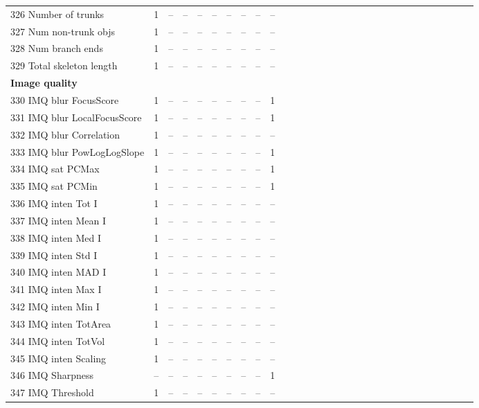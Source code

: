 \documentclass[sn-mathphys,Numbered]{sn-jnl}%
\theoremstyle{thmstyleone}%
\theoremstyle{thmstyletwo}%
\theoremstyle{thmstylethree}%
\begin{document}
\begin{table}[!hbt]
\begin{tiny}
\begin{tabular} {
l  c  c  c  c  c  c  c  c  c  l  c  c  c  c  c  c  c  c  c  l  c  c  c  c  c  c  c  c  c
}
 326 Number of trunks & 1 & -- & -- & -- & -- & -- & -- & -- & -- \\
 327 Num non-trunk objs & 1 & -- & -- & -- & -- & -- & -- & -- & -- \\
 328 Num branch ends & 1 & -- & -- & -- & -- & -- & -- & -- & -- \\
 329 Total skeleton length & 1 & -- & -- & -- & -- & -- & -- & -- & -- \\
\hspace{2mm}  \bf Image quality \rm &  &  &  &  &  &  &  &  &  \\
 330 IMQ blur FocusScore & 1 & -- & -- & -- & -- & -- & -- & -- & 1 \\
 331 IMQ blur LocalFocusScore & 1 & -- & -- & -- & -- & -- & -- & -- & 1 \\
 332 IMQ blur Correlation & 1 & -- & -- & -- & -- & -- & -- & -- & -- \\
 333 IMQ blur PowLogLogSlope & 1 & -- & -- & -- & -- & -- & -- & -- & 1 \\
 334 IMQ sat PCMax & 1 & -- & -- & -- & -- & -- & -- & -- & 1 \\
 335 IMQ sat PCMin & 1 & -- & -- & -- & -- & -- & -- & -- & 1 \\
 336 IMQ inten Tot I & 1 & -- & -- & -- & -- & -- & -- & -- & -- \\
 337 IMQ inten Mean I & 1 & -- & -- & -- & -- & -- & -- & -- & -- \\
 338 IMQ inten Med I & 1 & -- & -- & -- & -- & -- & -- & -- & -- \\
 339 IMQ inten Std I & 1 & -- & -- & -- & -- & -- & -- & -- & -- \\
 340 IMQ inten MAD I & 1 & -- & -- & -- & -- & -- & -- & -- & -- \\
 341 IMQ inten Max I & 1 & -- & -- & -- & -- & -- & -- & -- & -- \\
 342 IMQ inten Min I & 1 & -- & -- & -- & -- & -- & -- & -- & -- \\
 343 IMQ inten TotArea & 1 & -- & -- & -- & -- & -- & -- & -- & -- \\
 344 IMQ inten TotVol & 1 & -- & -- & -- & -- & -- & -- & -- & -- \\
 345 IMQ inten Scaling & 1 & -- & -- & -- & -- & -- & -- & -- & -- \\
 346 IMQ Sharpness & -- & -- & -- & -- & -- & -- & -- & -- & 1 \\
 347 IMQ Threshold & 1 & -- & -- & -- & -- & -- & -- & -- & -- \\

\bottomrule
\end{tabular}
\end{tiny}
\end{table}
\end{document}
